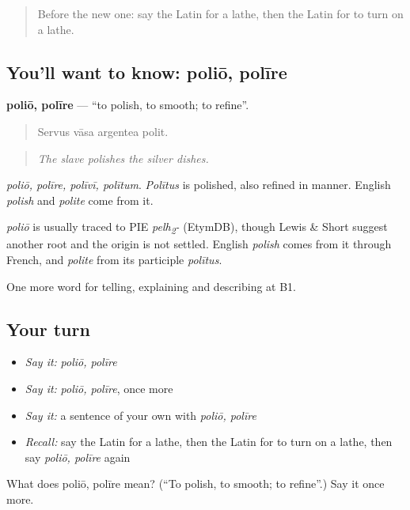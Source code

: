 \begin{quote}
Before the new one: say the Latin for a lathe, then the Latin for to turn on a lathe.
\end{quote}

\subsection*{You'll want to know: poliō, polīre}
\textbf{poliō, polīre} — \textquotedblleft{}to polish, to smooth; to refine\textquotedblright{}.

\begin{quote}
Servus vāsa argentea polit.
\end{quote}

\begin{quote}
\emph{The slave polishes the silver dishes.}
\end{quote}

\emph{poliō, polīre, polīvī, polītum}. \emph{Polītus} is polished, also refined in manner. English \emph{polish} and \emph{polite} come from it.

\begin{cousinweb}
\emph{poliō} is usually traced to PIE \emph{pelh\textsubscript{2}-} (EtymDB), though Lewis \& Short suggest another root and the origin is not settled. English \emph{polish} comes from it through French, and \emph{polite} from its participle \emph{polītus}.
\end{cousinweb}

\begin{grammarlens}[title={What you've built}]
One more word for telling, explaining and describing at B1.
\end{grammarlens}

\subsection*{Your turn}
\begin{itemize}
\raggedright
  \item \emph{Say it:} \emph{poliō, polīre}
  \item \emph{Say it:} \emph{poliō, polīre}, once more
  \item \emph{Say it:} a sentence of your own with \emph{poliō, polīre}
  \item \emph{Recall:} say the Latin for a lathe, then the Latin for to turn on a lathe, then say \emph{poliō, polīre} again
\end{itemize}

\begin{tcolorbox}[breakable,colback=teal!4,colframe=teal!35!black,title={Before you move on}]
What does poliō, polīre mean? (\textquotedblleft{}To polish, to smooth; to refine\textquotedblright{}.) Say it once more.
\end{tcolorbox}
